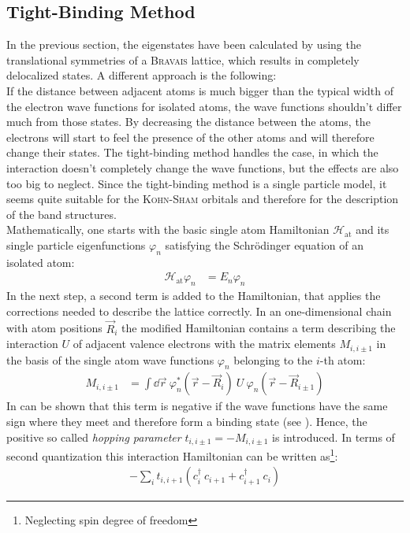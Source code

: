 \subsection{Tight-Binding Method}
In the previous section, the eigenstates have been calculated by using the translational symmetries of a \textsc{Bravais} lattice, which results in completely delocalized states. A different approach is the following:\\
If the distance between adjacent atoms is much bigger than the typical width of the electron wave functions for isolated atoms, the wave functions shouldn't differ much from those states. By decreasing the distance between the atoms, the electrons will start to feel the presence of the other atoms and will therefore change their states. The tight-binding method handles the case, in which the interaction doesn't completely change the wave functions, but the effects are also too big to neglect. Since the tight-binding method is a single particle model, it seems quite suitable for the \textsc{Kohn-Sham} orbitals and therefore for the description of the band structures.\\
Mathematically, one starts with the basic single atom Hamiltonian $\mathcal{H}_{\text{at}}$ and its single particle eigenfunctions $\varphi_n$ satisfying the Schrödinger equation of an isolated atom:
\begin{align}
	\mathcal{H}_{\text{at}} \varphi_n &= E_n \varphi_n
\end{align}
In the next step, a second term is added to the Hamiltonian, that applies the corrections needed to describe the lattice correctly. In an one-dimensional chain with atom positions $\vec{R}_i$ the modified Hamiltonian contains a term describing the interaction $U$ of adjacent valence electrons with the matrix elements $M_{i, i\pm1}$ in the basis of the single atom wave functions $\varphi_n$ belonging to the $i$-th atom:
\begin{align}
	M_{i, i\pm1} &= \int\dd\vec{r}\ \varphi_n^*\left(\vec{r} - \vec{R}_i\right)\ U\ \varphi_n\left(\vec{r}-\vec{R}_{i\pm1}\right) 
\end{align}
In can be shown that this term is negative if the wave functions have the same sign where they meet and therefore form a binding state (see \cite{rohrer}). Hence, the positive so called \emph{hopping parameter} $t_{i, i\pm 1} = - M_{i, i\pm 1}$ is introduced. In terms of second quantization this interaction Hamiltonian can be written as\footnote{Neglecting spin degree of freedom}:
\begin{align}
	- \sum_i t_{i, i+1} \left(c_i^\dagger\  c_{i+1} + c_{i+1}^\dagger\  c_i\right)
\end{align}
